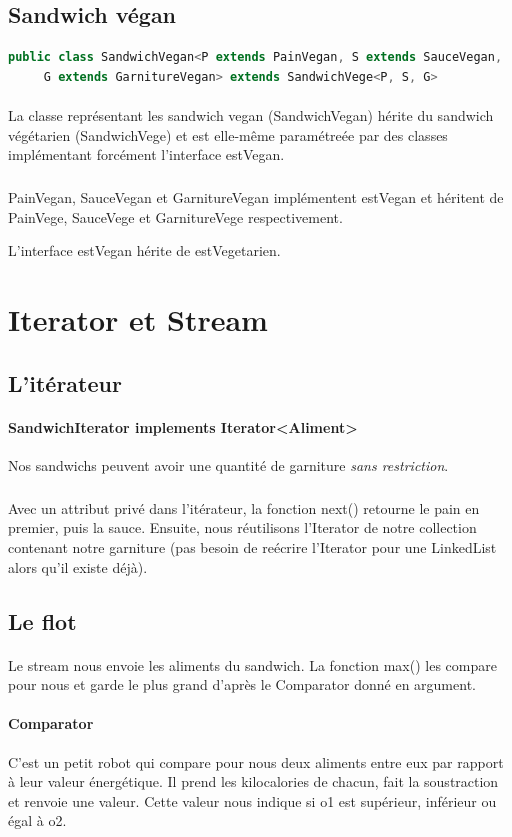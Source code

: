 \documentclass[a4paper]{article}
\begin{document}
\subsection{Sandwich végan}
\begin{lstlisting}[language=Java, caption=Entête de la classe SandwichVegan]
    public class SandwichVegan<P extends PainVegan, S extends SauceVegan,
     G extends GarnitureVegan> extends SandwichVege<P, S, G>
\end{lstlisting}
\paragraph{}
La classe représentant les sandwich vegan (SandwichVegan) hérite du sandwich végétarien (SandwichVege) et est elle-même paramétreée par des classes implémentant forcément l'interface estVegan.
\subparagraph{}
PainVegan, SauceVegan et GarnitureVegan implémentent estVegan et héritent de PainVege, SauceVege et GarnitureVege respectivement.

L'interface estVegan hérite de estVegetarien.


\section{Iterator et Stream}
\subsection{L'itérateur}
\paragraph{SandwichIterator implements Iterator<Aliment>}
Nos sandwichs peuvent avoir une quantité de garniture \emph{sans restriction}.

\subparagraph{}
Avec un attribut privé dans l'itérateur, la fonction next() retourne le pain en premier, puis la sauce.
Ensuite, nous réutilisons l'Iterator de notre collection contenant notre garniture (pas besoin de reécrire l'Iterator pour une LinkedList alors qu'il existe déjà).

\subsection{Le flot}
\paragraph{}
Le stream nous envoie les aliments du sandwich. La fonction max() les compare pour nous et garde le plus grand d'après le Comparator donné en argument. 
\paragraph{Comparator}
C'est un petit robot qui compare pour nous deux aliments entre eux  par rapport à leur valeur énergétique.
Il prend les kilocalories de chacun, fait la soustraction et renvoie une valeur. Cette valeur nous indique si o1 est supérieur, inférieur ou égal à o2.
\end{document}
